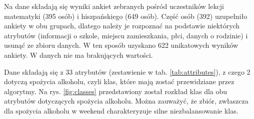 Na dane składają się wyniki ankiet zebranych pośród uczestników lekcji matematyki (395 osób) i hiszpańskiego (649 osób). Część osób (392) uzupełniło ankiety w obu grupach, dlatego należy je rozpoznać na podstawie niektórych atrybutów (informacji o szkole, miejscu zamieszkania, płci, danych o rodzinie) i usunąć ze zbioru danych. W ten sposób uzyskano 622 unikatowych wyników ankiety. W danych nie ma brakujących wartości.

Dane składają się z 33 atrybutów (zestawienie w tab. \ref{tab:attributes}), z czego 2 dotyczą spożycia alkoholu, czyli klas, które mają zostać przewidziane przez algorytmy. Na rys. \ref{fig:classes} przedstawiony został rozkład klas dla obu atrybutów dotyczących spożycia alkoholu. Można zauważyć, że zbiór, zwłaszcza dla spożycia alkoholu w weekend charakteryzuje silne niezbalansowanie klas.

